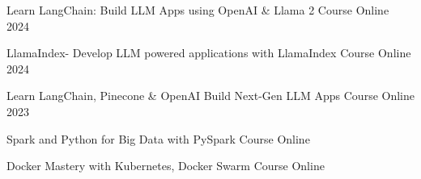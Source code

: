 


\begin{cvhonors}

  \cvhonor
    {Learn LangChain: Build LLM Apps using OpenAI \& Llama 2} %
    {Course} %
    {Online} %
    {2024} %

  \cvhonor
    {LlamaIndex- Develop LLM powered applications with LlamaIndex} %
    {Course} %
    {Online} %
    {2024} %

  \cvhonor
    {Learn LangChain, Pinecone \& OpenAI Build Next-Gen LLM Apps} %
    {Course} %
    {Online} %
    {2023} %

  \cvhonor
    {Spark and Python for Big Data with PySpark} %
    {Course} %
    {Online} %
    {} %

  \cvhonor
    {Docker Mastery with Kubernetes, Docker Swarm} %
    {Course} %
    {Online} %
    {} %


\end{cvhonors}



